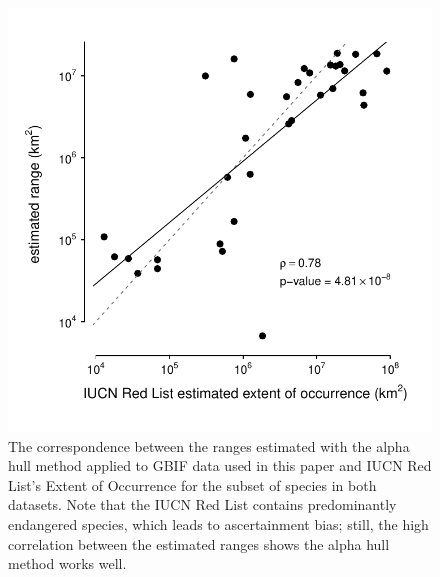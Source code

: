 \documentclass[11pt]{article}
\begin{document}
\begin{figure}[!htb]
  \centering
  \includegraphics[]{figures/iucn_redlist_ranges.pdf}

  \caption{The correspondence between the ranges estimated with the alpha hull
    method applied to GBIF data used in this paper and IUCN Red List's Extent
    of Occurrence for the subset of species in both datasets. Note that the
    IUCN Red List contains predominantly endangered species, which leads to
    ascertainment bias; still, the high correlation between the estimated
  ranges shows the alpha hull method works well.}

  \label{suppfig:redlist-ranges}
\end{figure}
\end{document}
